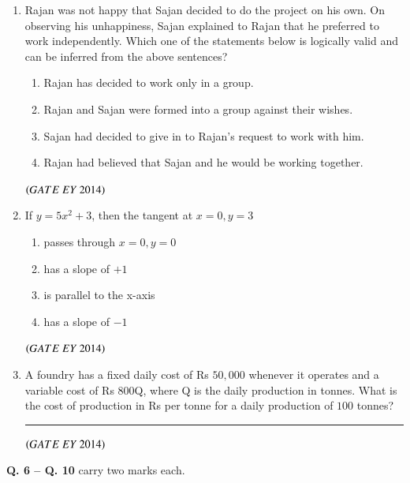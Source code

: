 \documentclass[journal]{IEEEtran}
\numberwithin{equation}{enumi}
\numberwithin{figure}{enumi}
\begin{document}
\begin{enumerate}
    \item Rajan was not happy that Sajan decided to do the project on his own. On observing his unhappiness, Sajan explained to Rajan that he preferred to work independently. \newline Which one of the statements below is logically valid and can be inferred from the above sentences?
    \begin{enumerate}
        \item Rajan has decided to work only in a group.
        \item Rajan and Sajan were formed into a group against their wishes.
        \item Sajan had decided to give in to Rajan's request to work with him.
        \item Rajan had believed that Sajan and he would be working together.
    \end{enumerate}
    \hfill{$\brak{ GATE\ EY\ 2014}$}
    \bigskip

    \item If $y=5x^{2}+3$, then the tangent at $x=0, y=3$
    \begin{multicols}{2}
    \begin{enumerate}
        \item passes through $x=0, y=0$
        \item has a slope of $+1$
        \item is parallel to the x-axis
        \item has a slope of $-1$
    \end{enumerate}
    \end{multicols}
    \hfill{$\brak{ GATE\ EY\ 2014}$}
    \bigskip

    \item A foundry has a fixed daily cost of Rs $50,000$ whenever it operates and a variable cost of Rs $800$Q, where Q is the daily production in tonnes. What is the cost of production in Rs per tonne for a daily production of $100$ tonnes? \rule{3cm}{0.15mm}

    \hfill{$\brak{ GATE\ EY\ 2014}$}
    \bigskip
\end{enumerate}

\noindent \textbf{Q. 6 -- Q. 10} carry two marks each.
\end{document}
